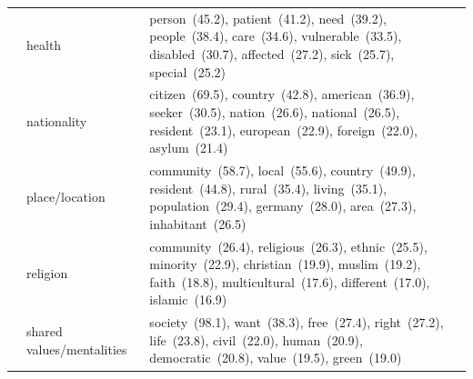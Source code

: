 \begin{table}[!th]
\begin{tabular}{l L{4.5cm} L{0.85\textwidth}}
 & health & person~(45.2), patient~(41.2), need~(39.2), people~(38.4), care~(34.6), vulnerable~(33.5), disabled~(30.7), affected~(27.2), sick~(25.7), special~(25.2) \\
 & nationality & citizen~(69.5), country~(42.8), american~(36.9), seeker~(30.5), nation~(26.6), national~(26.5), resident~(23.1), european~(22.9), foreign~(22.0), asylum~(21.4) \\
 & place/location & community~(58.7), local~(55.6), country~(49.9), resident~(44.8), rural~(35.4), living~(35.1), population~(29.4), germany~(28.0), area~(27.3), inhabitant~(26.5) \\
 & religion & community~(26.4), religious~(26.3), ethnic~(25.5), minority~(22.9), christian~(19.9), muslim~(19.2), faith~(18.8), multicultural~(17.6), different~(17.0), islamic~(16.9) \\
 & shared values/mentalities & society~(98.1), want~(38.3), free~(27.4), right~(27.2), life~(23.8), civil~(22.0), human~(20.9), democratic~(20.8), value~(19.5), green~(19.0) \\
\bottomrule
\end{tabular}
\end{table}
